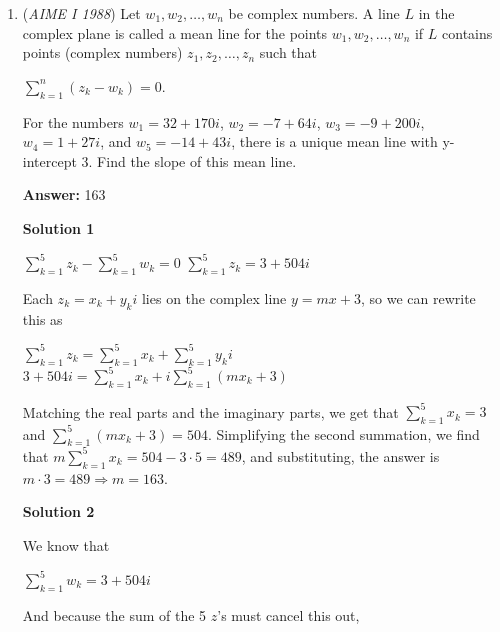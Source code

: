 \begin{enumerate}
 



\textbf{Solution 5}

We can also use Euler's formula to find the number of vertices. For any polyhedron, it holds that $V - E + F = 2$. There are $12 + 8 + 6 = 26$ faces. Additionally, the shapes in total have $4 \cdot 12 + 6 \cdot 8 + 8 \cdot 6 = 144$ edges. At an edge of the polyhedron, exactly two of these edges coincide, so we divide by $2$ to get $\frac{144}{2} = 72$. Plugging in our numbers, we have that $V - 72 + 26 = 2$. When solved, this gives $V = 48$. Proceed using any of the methods above.

 


	\item (\textit{AIME I 1988}) Let $w_1, w_2, \dots, w_n$ be complex numbers. A line $L$ in the complex plane is called a mean line for the points $w_1, w_2, \dots, w_n$ if $L$ contains points (complex numbers) $z_1, z_2, \dots, z_n$ such that


 $\sum_{k = 1}^n (z_k - w_k) = 0.$

 For the numbers $w_1 = 32 + 170i$, $w_2 = -7 + 64i$, $w_3 = -9 +200i$, $w_4 = 1 + 27i$, and $w_5 = -14 + 43i$, there is a unique mean line with y-intercept $3$. Find the slope of this mean line.


 
 \textbf{Answer: }163



\textbf{Solution 1}

$\sum_{k=1}^5 z_k - \sum_{k=1}^5 w_k = 0$
$\sum_{k=1}^5 z_k = 3 + 504i$

 Each $z_k = x_k + y_ki$ lies on the complex line $y = mx + 3$, so we can rewrite this as 

 $\sum_{k=1}^5 z_k = \sum_{k=1}^5 x_k + \sum_{k=1}^5 y_ki$
$3 + 504i = \sum_{k=1}^5 x_k + i \sum_{k=1}^5 (mx_k + 3)$

 Matching the real parts and the imaginary parts, we get that $\sum_{k=1}^5 x_k = 3$ and $\sum_{k=1}^5 (mx_k + 3) = 504$. Simplifying the second summation, we find that $m\sum_{k=1}^5 x_k = 504 - 3 \cdot 5 = 489$, and substituting, the answer is $m \cdot 3 = 489 \Longrightarrow m = 163$.

 



\textbf{Solution 2}

We know that 

 $\sum_{k=1}^5 w_k = 3 + 504i$

 And because the sum of the 5 $z$'s must cancel this out,


\end{enumerate}
